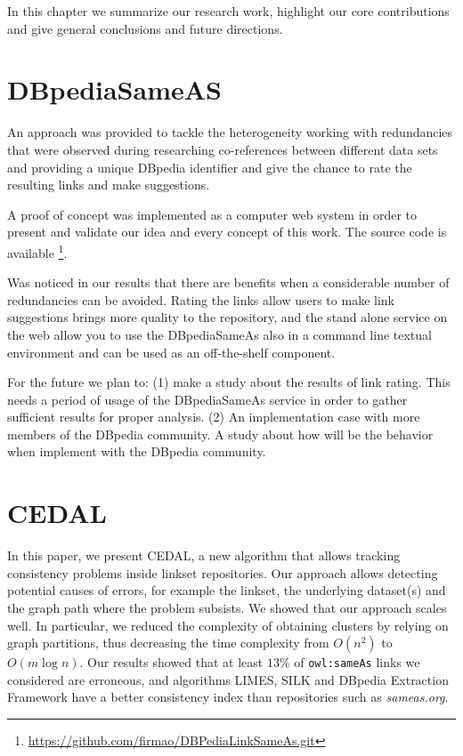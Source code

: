 In this chapter we summarize our research work, highlight our core contributions and give general conclusions and future directions.

\section{DBpediaSameAS}
An approach was provided to tackle the heterogeneity working with  redundancies that were observed during researching co-references between different data sets and providing a unique DBpedia identifier and give the chance to rate the resulting links and make suggestions.

A proof of concept was implemented as a computer web system in order to present and validate our idea and every concept of this work. The source code is available \footnote{\url{https://github.com/firmao/DBPediaLinkSameAs.git}}.

Was noticed in our results that there are benefits when a considerable number of  redundancies can be avoided. Rating the links allow users to make link suggestions brings more quality to the repository, and the stand alone service on the web allow you to use the DBpediaSameAs also in a command line textual environment and can be used as an off-the-shelf component.

For the future we plan to:
(1) make a study about the results of link rating. This needs a period of usage of the DBpediaSameAs service in order to gather sufficient results for proper analysis.
(2) An implementation case with more members of the DBpedia community. A study about how will be the behavior when implement with the DBpedia community.

\section{CEDAL}
In this paper, we present CEDAL, a new algorithm that allows tracking consistency problems inside linkset repositories. Our approach allows detecting potential causes of errors, for example the linkset, the underlying dataset(s) and the graph path where the problem subsists.
We showed that our approach scales well. In particular, we reduced the complexity of obtaining clusters by relying on graph partitions, thus decreasing the time complexity from $O(n^2)$ to $O(m \log n)$.
Our results showed that at least $13\%$ of \texttt{owl:sameAs} links we considered are erroneous, and algorithms LIMES, SILK and DBpedia Extraction Framework have a better consistency index than repositories such as \emph{sameas.org}. %

